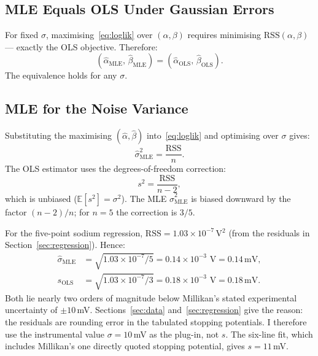 \documentclass[12pt]{article}
\begin{document}
\subsection{MLE Equals OLS Under Gaussian Errors}

For fixed $\sigma$, maximising~\eqref{eq:loglik} over $(\alpha,\beta)$ requires
minimising $\mathrm{RSS}(\alpha,\beta)$ --- exactly the OLS objective.
Therefore:
\begin{equation}\label{eq:mle_ols}
  \boxed{(\hat\alpha_{\mathrm{MLE}},\,\hat\beta_{\mathrm{MLE}})
         = (\hat\alpha_{\mathrm{OLS}},\,\hat\beta_{\mathrm{OLS}}).}
\end{equation}
The equivalence holds for any $\sigma$.

\subsection{MLE for the Noise Variance}

Substituting the maximising $(\hat\alpha,\hat\beta)$ into~\eqref{eq:loglik} and
optimising over $\sigma$ gives:
\begin{equation}\label{eq:sigma_mle}
  \hat\sigma_{\mathrm{MLE}}^2 = \frac{\mathrm{RSS}}{n}.
\end{equation}
The OLS estimator uses the degrees-of-freedom correction:
\begin{equation}\label{eq:sigma_ols}
  s^2 = \frac{\mathrm{RSS}}{n-2},
\end{equation}
which is unbiased ($\mathbb{E}[s^2]=\sigma^2$).  The MLE $\hat\sigma^2_{\mathrm{MLE}}$
is biased downward by the factor $(n-2)/n$; for $n=5$ the correction is $3/5$.

For the five-point sodium regression,
$\mathrm{RSS} = 1.03\times10^{-7}$\,V$^2$ (from the residuals in
Section~\ref{sec:regression}).  Hence:
\begin{align*}
  \hat\sigma_{\mathrm{MLE}} &= \sqrt{1.03\times10^{-7}/5}
  = 0.14\times10^{-3}\text{ V} = 0.14\,\text{mV}, \\
  s_{\mathrm{OLS}}  &= \sqrt{1.03\times10^{-7}/3}
  = 0.18\times10^{-3}\text{ V} = 0.18\,\text{mV}.
\end{align*}
Both lie nearly two orders of magnitude below Millikan's stated experimental
uncertainty of $\pm10$\,mV.  Sections~\ref{sec:data}
and~\ref{sec:regression} give the reason: the residuals are rounding error in
the tabulated stopping potentials.  I therefore use the instrumental value
$\sigma = 10$\,mV as the plug-in, not $s$.  The six-line fit, which includes
Millikan's one directly quoted stopping potential, gives $s = 11$\,mV.
\end{document}
